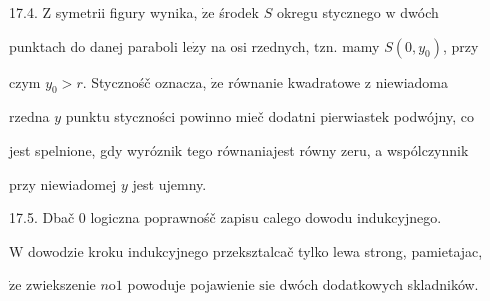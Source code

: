 \documentclass[a4paper,12pt]{article}
\begin{document}
17.4. $\mathrm{Z}$ symetrii figury wynika, $\dot{\mathrm{z}}\mathrm{e}$ środek $S$ okregu stycznego $\mathrm{w}$ dwóch

punktach do danej paraboli $\mathrm{l}\mathrm{e}\dot{\mathrm{z}}\mathrm{y}$ na osi rzednych, $\mathrm{t}\mathrm{z}\mathrm{n}$. mamy $S(0,y_{0})$, przy

czym $y_{0} > r$. Stycznośč oznacza, $\dot{\mathrm{z}}\mathrm{e}$ równanie kwadratowe $\mathrm{z}$ niewiadoma

rzedna $y$ punktu styczności powinno mieč dodatni pierwiastek podwójny, co

jest spelnione, gdy wyróznik tego równaniajest równy zeru, a wspólczynnik

przy niewiadomej $y$ jest ujemny.

17.5. Dbač $0$ logiczna poprawnośč zapisu calego dowodu indukcyjnego.

$\mathrm{W}$ dowodzie kroku indukcyjnego przeksztalcač tylko lewa strong, pamietajac,

$\dot{\mathrm{z}}\mathrm{e}$ zwiekszenie $n\mathrm{o}1$ powoduje pojawienie $\mathrm{s}\mathrm{i}\mathrm{e}$ dwóch dodatkowych skladników.
\end{document}
